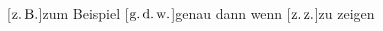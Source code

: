 \begin{acronym}
[\ensuremath{\tx{z.\,B.}\xspace}]{zum Beispiel}
[\ensuremath{\mbox{g.\,d.\,w.}\xspace}]{genau dann wenn}
[\ensuremath{\mbox{z.\,z.}\xspace}]{zu zeigen}
\end{acronym}

